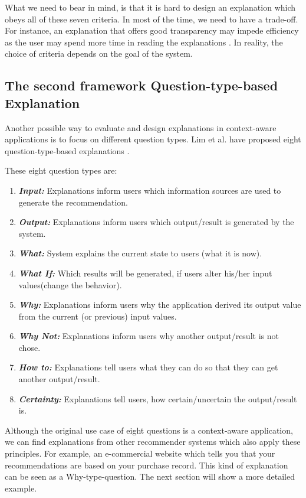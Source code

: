         \indent 
        What we need to bear in mind, is that it is hard to design an explanation which obeys all of these seven criteria. In most of the time, we need to have a trade-off. For instance, an explanation that offers good transparency may impede efficiency as the user may spend more time in reading the explanations \cite{tintarev2007survey}.
        In reality, the choice of criteria depends on the goal of the system. 

\subsection{The second framework Question-type-based Explanation}

    \indent
    Another possible way to evaluate and design explanations in context-aware applications is to focus on different question types. Lim et al. have proposed eight question-type-based explanations \cite{lim2010toolkit}.

    \indent These eight question types are:

    \begin{enumerate}
        \item \textbf{\textit{Input:}} Explanations inform users which information sources are used to generate the recommendation.
        \item \textbf{\textit{Output:}} Explanations inform users which output/result is generated by the system.
        \item \textbf{\textit{What:}} System explains the current state to users (what it is now).
        \item \textbf{\textit{What If:}} Which results will be generated, if users alter his/her input values(change the behavior).
        \item \textbf{\textit{Why:}} Explanations inform users why the application derived its output value from the current (or previous) input values\cite{lim2010toolkit}.
        \item \textbf{\textit{Why Not:}} Explanations inform users why another output/result is not chose.
        \item \textbf{\textit{How to:}} Explanations tell users what they can do so that they can get another output/result.
        \item \textbf{\textit{Certainty:}} Explanations tell users, how certain/uncertain the output/result is.
    \end{enumerate}

    \indent Although the original use case of eight questions is a context-aware application, we can find explanations from other recommender systems which also apply these principles. For example, an e-commercial website which tells you that your recommendations are based on your purchase record. This kind of explanation can be seen as a Why-type-question.  The next section will show a more detailed example.
    
